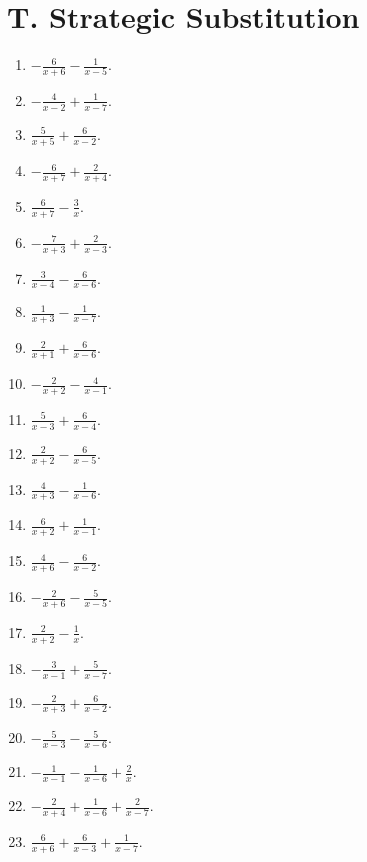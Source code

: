 \documentclass[11pt,oneside]{book}
\begin{document}
\section*{T. Strategic Substitution}
\begin{enumerate}[leftmargin=*,label=\textbf{T\arabic*.},itemsep=0.45\baselineskip]
\item $\displaystyle - \frac{6}{x + 6} - \frac{1}{x - 5}$.
\item $\displaystyle - \frac{4}{x - 2} + \frac{1}{x - 7}$.
\item $\displaystyle \frac{5}{x + 5} + \frac{6}{x - 2}$.
\item $\displaystyle - \frac{6}{x + 7} + \frac{2}{x + 4}$.
\item $\displaystyle \frac{6}{x + 7} - \frac{3}{x}$.
\item $\displaystyle - \frac{7}{x + 3} + \frac{2}{x - 3}$.
\item $\displaystyle \frac{3}{x - 4} - \frac{6}{x - 6}$.
\item $\displaystyle \frac{1}{x + 3} - \frac{1}{x - 7}$.
\item $\displaystyle \frac{2}{x + 1} + \frac{6}{x - 6}$.
\item $\displaystyle - \frac{2}{x + 2} - \frac{4}{x - 1}$.
\item $\displaystyle \frac{5}{x - 3} + \frac{6}{x - 4}$.
\item $\displaystyle \frac{2}{x + 2} - \frac{6}{x - 5}$.
\item $\displaystyle \frac{4}{x + 3} - \frac{1}{x - 6}$.
\item $\displaystyle \frac{6}{x + 2} + \frac{1}{x - 1}$.
\item $\displaystyle \frac{4}{x + 6} - \frac{6}{x - 2}$.
\item $\displaystyle - \frac{2}{x + 6} - \frac{5}{x - 5}$.
\item $\displaystyle \frac{2}{x + 2} - \frac{1}{x}$.
\item $\displaystyle - \frac{3}{x - 1} + \frac{5}{x - 7}$.
\item $\displaystyle - \frac{2}{x + 3} + \frac{6}{x - 2}$.
\item $\displaystyle - \frac{5}{x - 3} - \frac{5}{x - 6}$.
\item $\displaystyle - \frac{1}{x - 1} - \frac{1}{x - 6} + \frac{2}{x}$.
\item $\displaystyle - \frac{2}{x + 4} + \frac{1}{x - 6} + \frac{2}{x - 7}$.
\item $\displaystyle \frac{6}{x + 6} + \frac{6}{x - 3} + \frac{1}{x - 7}$.

\end{enumerate}
\end{document}
